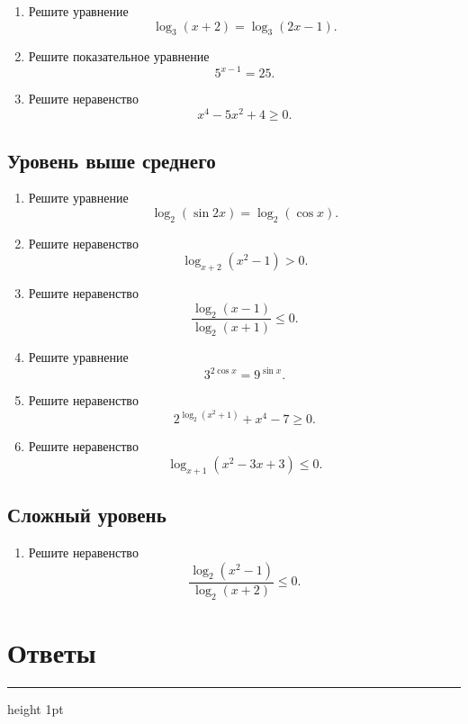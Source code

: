 \documentclass[a4paper,12pt]{article}
\newcommand{\sectionrule}{%
  \vspace{-2mm}
  {\color{lightaccent}\hrule height 1pt}
  \vspace{3mm}
}
\begin{document}
\begin{enumerate}
  \item Решите уравнение
  \[
  \log_3(x+2)=\log_3(2x-1).
  \]

  \item Решите показательное уравнение
  \[
  5^{x-1}=25.
  \]

  \item Решите неравенство
  \[
  x^4-5x^2+4\ge0.
  \]
\end{enumerate}

\subsection*{\textcolor{accent}{Уровень выше среднего}}

\begin{enumerate}[resume]
  \item Решите уравнение
  \[
  \log_2(\sin2x)=\log_2(\cos x).
  \]

  \item Решите неравенство
  \[
  \log_{x+2}(x^2-1)>0.
  \]

  \item Решите неравенство
  \[
  \frac{\log_2(x-1)}{\log_2(x+1)}\le0.
  \]

  \item Решите уравнение
  \[
  3^{2\cos x}=9^{\sin x}.
  \]

  \item Решите неравенство
  \[
  2^{\log_2(x^2+1)}+x^4-7\ge0.
  \]

  \item Решите неравенство
  \[
  \log_{x+1}(x^2-3x+3)\le0.
  \]
\end{enumerate}

\subsection*{\textcolor{accent}{Сложный уровень}}

\begin{enumerate}[resume]
  \item Решите неравенство
  \[
  \frac{\log_2(x^2-1)}{\log_2(x+2)}\le0.
  \]
\end{enumerate}

\clearpage
\section*{\textcolor{darkaccent}{Ответы}}
\sectionrule
\end{document}
